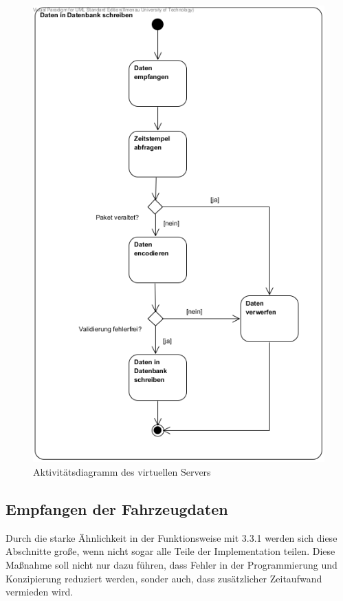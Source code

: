 \documentclass[fontsize = 12pt, paper = a4]{scrreprt}
\begin{document}
\begin{figure}[h]
\centering
\includegraphics[scale = 0.70]{activity_vserver.png}
\caption{Aktivitätsdiagramm des virtuellen Servers}
\end{figure}


\newpage


\subsection{Empfangen der Fahrzeugdaten}

Durch die starke Ähnlichkeit in der Funktionsweise mit 3.3.1 werden sich diese Abschnitte große, wenn nicht sogar alle Teile der Implementation teilen. Diese Maßnahme soll nicht nur dazu führen, dass Fehler in der Programmierung und Konzipierung reduziert werden, sonder auch, dass zusätzlicher Zeitaufwand vermieden wird. 
\end{document}
